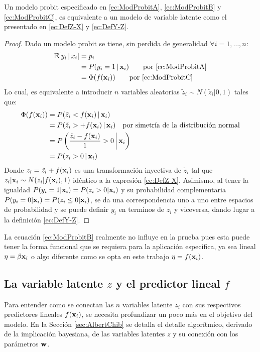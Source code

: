 \documentclass[../Main/Main.tex]{subfiles}
\begin{document}
\begin{theorem}
Un modelo probit especificado en \eqref{ec:ModProbitA}, \eqref{ec:ModProbitB} y \eqref{ec:ModProbitC}, es equivalente a un modelo de variable latente como el presentado en \eqref{ec:DefZ-X} y \eqref{ec:DefY-Z}.
\end{theorem}

\begin{proof} Dado un modelo probit se tiene, sin perdida de generalidad $\forall i = 1,\ldots,n$:
\begin{align*}
	\mathbb{E}[y_i\,|\,x_i] &= p_i  \\
				&= P(y_i = 1\,|\,\mathbf{x}_i)  \qquad \text{por \eqref{ec:ModProbitA}}\\
				&= \Phi(f(\mathbf{x}_i)) \qquad \text{por \eqref{ec:ModProbitC}}
\end{align*}
Lo cual, es equivalente a introducir $n$ variables aleatorias $\tilde{z}_i \sim N(\tilde{z}_i|0,1)$ tales que:
\begin{align*}
	\Phi(f(\mathbf{x}_i)) 	&= P(\tilde{z}_i < f(\mathbf{x}_i)\,|\,\mathbf{x}_i)\\
			      	&= P(\tilde{z}_i > +f(\mathbf{x}_i)\,|\,\mathbf{x}_i) \quad \text{por simetría de la distribución normal}\\
			      	&= P\left(\dfrac{\tilde{z}_i - f(\mathbf{x}_i)}{1} > 0\,\bigg|\,\mathbf{x}_i\right)\\
			      	&= P(z_i > 0\,|\,\mathbf{x}_i)
\end{align*}
Donde $z_i = \tilde{z_i} + f(\mathbf{x}_i)$ es una transformación inyectiva de $\tilde{z}_i$ tal que $z_i|\mathbf{x}_i \sim N(z_i|f(\mathbf{x}_i),1)$ idéntico a la expresión \eqref{ec:DefZ-X}. Asimismo, al tener la igualdad $P(y_i = 1|\mathbf{x}_i) = P(z_i > 0|\mathbf{x}_i)$ y su probabilidad complementaria $P(y_i = 0|\mathbf{x}_i) = P(z_i \leq 0|\mathbf{x}_i)$, se da una correspondencia uno a uno entre espacios de probabilidad y se puede definir $y_i$ en terminos de $z_i$ y viceversa, dando lugar a la definición \eqref{ec:DefY-Z}. 
\end{proof}

La ecuación \eqref{ec:ModProbitB} realmente no influye en la prueba pues esta puede tener la forma funcional que se requiera para la aplicación especifica, ya sea lineal $\eta = \beta\mathbf{x}_i$ o algo diferente como se opta en este trabajo $\eta = f(\mathbf{x}_i)$.

\subsection{La variable latente $z$ y el predictor lineal $f$} \label{sec:VarLat}
Para entender como se conectan las $n$ variables latente $z_i$ con sus respectivos predictores lineales $f(\mathbf{x}_i)$, se necesita profundizar un poco más en el objetivo del modelo. En la Sección \ref{sec:AlbertChib} se detalla el detalle algorítmico, derivado de la implicación bayesiana, de las variables latentes $z$ y su conexión con los parámetros $\mathbf{w}$. 
\end{document}
